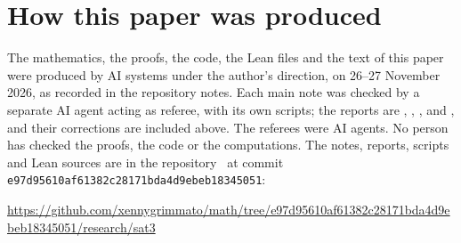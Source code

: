 \documentclass[10pt]{amsart}
\theoremstyle{plain}
\theoremstyle{definition}
\theoremstyle{remark}
\numberwithin{equation}{section}
\newcommand{\commit}{e97d95610af61382c28171bda4d9ebeb18345051}
\edef\repourl{https://github.com/xennygrimmato/math/tree/\commit/research/sat3}
\begin{document}
\section{How this paper was produced}\label{sec:provenance}

The mathematics, the proofs, the code, the Lean files and the text of this paper were produced by AI systems
under the author's direction, on 26--27 November 2026, as recorded in the repository notes. Each main note was checked by a
separate AI agent acting as referee, with its own scripts; the reports are ,
, ,  and , and their corrections are
included above. The
referees were AI agents. No person has checked the proofs, the code or the computations. The notes, reports,
scripts and Lean sources are in the repository~\cite{Repo} at commit \texttt{\commit}:
\begin{center}\footnotesize\expandafter\url\expandafter{\repourl}\end{center}



\end{document}
